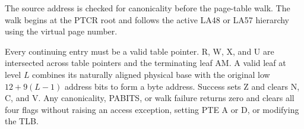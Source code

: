 The source address is checked for canonicality before the page-table walk. The walk begins at the PTCR root and follows the active LA48 or LA57 hierarchy using the virtual page number.

Every continuing entry must be a valid table pointer. R, W, X, and U are intersected across table pointers and the terminating leaf AM. A valid leaf at level $L$ combines its naturally aligned physical base with the original low $12+9(L-1)$ address bits to form a byte address. Success sets Z and clears N, C, and V. Any canonicality, PABITS, or walk failure returns zero and clears all four flags without raising an access exception, setting PTE A or D, or modifying the TLB.
